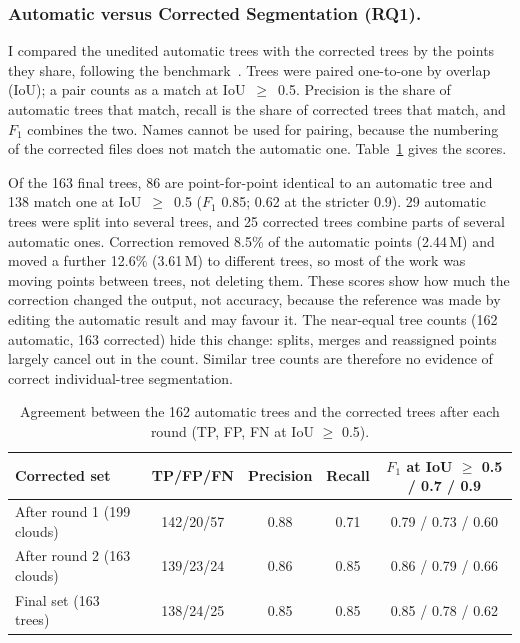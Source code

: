 \documentclass[runningheads]{llncs}
\begin{document}
\subsubsection{Automatic versus Corrected Segmentation (RQ1).}
I compared the unedited automatic trees with the corrected trees by the points they share, following the benchmark~\cite{cherlet2026}. Trees were paired one-to-one by overlap (IoU); a pair counts as a match at IoU~$\geq$~0.5. Precision is the share of automatic trees that match, recall is the share of corrected trees that match, and $F_1$ combines the two. Names cannot be used for pairing, because the numbering of the corrected files does not match the automatic one. Table~\ref{tab:rq1} gives the scores.

Of the 163 final trees, 86 are point-for-point identical to an automatic tree and 138 match one at IoU~$\geq$~0.5 ($F_1$ 0.85; 0.62 at the stricter 0.9). 29 automatic trees were split into several trees, and 25 corrected trees combine parts of several automatic ones. Correction removed 8.5\% of the automatic points (2.44\,M) and moved a further 12.6\% (3.61\,M) to different trees, so most of the work was moving points between trees, not deleting them. These scores show how much the correction changed the output, not accuracy, because the reference was made by editing the automatic result and may favour it. The near-equal tree counts (162 automatic, 163 corrected) hide this change: splits, merges and reassigned points largely cancel out in the count. Similar tree counts are therefore no evidence of correct individual-tree segmentation.

\begin{table}[!tb]
\caption{Agreement between the 162 automatic trees and the corrected trees after each round (TP, FP, FN at IoU $\ge$ 0.5).}\label{tab:rq1}
\centering\footnotesize
\begin{tabular}{@{}lcccc@{}}
\toprule
Corrected set & TP/FP/FN & Precision & Recall & $F_1$ at IoU $\ge$ 0.5 / 0.7 / 0.9\\
\midrule
After round 1 (199 clouds) & 142/20/57 & 0.88 & 0.71 & 0.79 / 0.73 / 0.60\\
After round 2 (163 clouds) & 139/23/24 & 0.86 & 0.85 & 0.86 / 0.79 / 0.66\\
Final set (163 trees) & 138/24/25 & 0.85 & 0.85 & 0.85 / 0.78 / 0.62\\
\bottomrule
\end{tabular}
\end{table}
\end{document}
